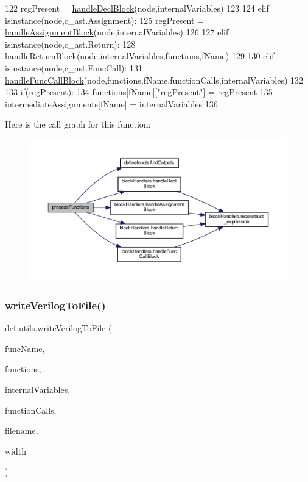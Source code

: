 \begin{DoxyCode}
122             regPresent = \hyperlink{namespaceblockHandlers_ad92852be9f2eee24eb76b2dd747e7584}{handleDeclBlock}(node,internalVariables)
123 
124         \textcolor{keywordflow}{elif} isinstance(node,c\_ast.Assignment):
125             regPresent = \hyperlink{namespaceblockHandlers_ac54cbd08eb8b12eed0c801fa775911dd}{handleAssignmentBlock}(node,internalVariables)
126 
127         \textcolor{keywordflow}{elif} isinstance(node,c\_ast.Return):
128             \hyperlink{namespaceblockHandlers_a9a619208834c3d0aa0861354376f5208}{handleReturnBlock}(node,internalVariables,functions,fName)
129 
130         \textcolor{keywordflow}{elif} isinstance(node,c\_ast.FuncCall):
131             \hyperlink{namespaceblockHandlers_ac034bd474478ead202ae756242b4348c}{handleFuncCallBlock}(node,functions,fName,functionCalls,internalVariables)
132 
133         if(regPresent):
134             functions[fName][\textcolor{stringliteral}{"regPresent"}] = regPresent
135     intermediateAssignments[fName] = internalVariables
136     
\end{DoxyCode}
Here is the call graph for this function\+:\nopagebreak
\begin{figure}[H]
\begin{center}
\leavevmode
\includegraphics[width=350pt]{namespaceutils_a4934e690de4b9b81cb16a1df0dbd73b9_cgraph}
\end{center}
\end{figure}
\mbox{\label{namespaceutils_a6f07e72ab5f460900eea8da9ad34aeec}} 
\subsubsection{\texorpdfstring{write\+Verilog\+To\+File()}{writeVerilogToFile()}}
{\footnotesize\ttfamily def utils.\+write\+Verilog\+To\+File (\begin{DoxyParamCaption}\item[{}]{func\+Name,  }\item[{}]{functions,  }\item[{}]{internal\+Variables,  }\item[{}]{function\+Calls,  }\item[{}]{filename,  }\item[{}]{width }\end{DoxyParamCaption})}

